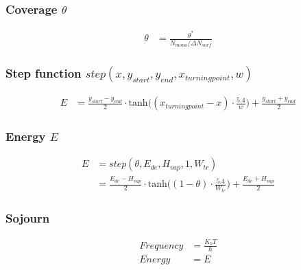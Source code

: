 \subsubsection*{Coverage $\theta$}
\begin{equation}
	\label{eq:cov}
	\begin{split}
		\theta&=\frac{\theta^*}{N_{mono}/\Delta N_{surf}}
	\end{split}
\end{equation}

\subsubsection*{Step function $step(x, y_{start}, y_{end}, x_{turning point}, w)$}
\begin{equation}
	\label{eq:stepfct}
	\begin{split}
		E&=\frac{y_{start}-y_{end}}{2} \cdot \text{tanh}\Big((x_{turning point}-x) \cdot \frac{5.4}{w}\Big) + \frac{y_{start}+y_{end}}{2}
	\end{split}
\end{equation}

\subsubsection*{Energy $E$}
\begin{equation}
	\label{eq:energy}
	\begin{split}
		E&= step(\theta, E_{de}, H_{vap}, 1, W_{tr})\\
		&=\frac{E_{de}-H_{vap}}{2} \cdot \text{tanh}\Big((1-\theta) \cdot \frac{5.4}{W_{tr}}\Big) + \frac{E_{de}+H_{vap}}{2}
	\end{split}
\end{equation}

\subsubsection*{Sojourn}
\begin{equation}
	\label{eq:sojourn}
	\begin{split}
		Frequency&=\frac{K_b T}{h}\\
		Energy&= E
	\end{split}
\end{equation}

